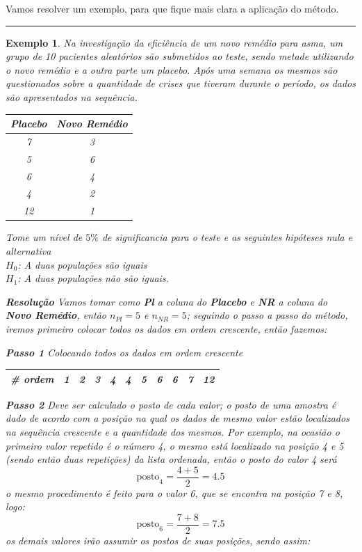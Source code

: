 \documentclass[
]{book}
\newtheorem{example}{Exemplo}
\begin{document}
Vamos resolver um exemplo, para que fique mais clara a aplicação do método.

\begin{center}\rule{0.5\linewidth}{0.5pt}\end{center}

\begin{example}
Na investigação da eficiência de um novo remédio para asma, um grupo de 10 pacientes aleatórios são submetidos ao teste, sendo metade utilizando o novo remédio e a outra parte um placebo. Após uma semana os mesmos são questionados sobre a quantidade de crises que tiveram durante o período, os dados são apresentados na sequência.

\begin{longtable}[]{@{}cc@{}}
\toprule
\textbf{Placebo} & \textbf{Novo Remédio} \\
\midrule
\endhead
7 & 3 \\
5 & 6 \\
6 & 4 \\
4 & 2 \\
12 & 1 \\
\bottomrule
\end{longtable}

Tome um nível de \(5\%\) de significancia para o teste e as seguintes hipóteses nula e alternativa\\
\(H_0\): A duas populações são iguais\\
\(H_1\): A duas populações não são iguais.

\textbf{Resolução} Vamos tomar como \textbf{Pl} a coluna do \textbf{Placebo} e \textbf{NR} a coluna do \textbf{Novo Remédio}, então \(n_{Pl} = 5\) e \(n_{NR} = 5\); seguindo o passo a passo do método, iremos primeiro colocar todos os dados em ordem crescente, então fazemos:

\textbf{Passo 1} Colocando todos os dados em ordem crescente

\begin{longtable}[]{@{}cllllllllll@{}}
\toprule
\# ordem & 1 & 2 & 3 & 4 & 4 & 5 & 6 & 6 & 7 & 12 \\
\midrule
\endhead
\bottomrule
\end{longtable}

\textbf{Passo 2} Deve ser calculado o posto de cada valor; o posto de uma amostra é dado de acordo com a posição na qual os dados de mesmo valor estão localizados na sequência crescente e a quantidade dos mesmos. Por exemplo, na ocasião o primeiro valor repetido é o número 4, o mesmo está localizado na posição 4 e 5 (sendo então duas repetições) da lista ordenada, então o posto do valor 4 será
\[
\text{posto}_4 = \frac{4+5}{2} = 4.5
\]
o mesmo procedimento é feito para o valor 6, que se encontra na posição 7 e 8, logo:
\[
\text{posto}_6 = \frac{7+8}{2} = 7.5
\]
os demais valores irão assumir os postos de suas posições, sendo assim:


\end{example}
\end{document}

